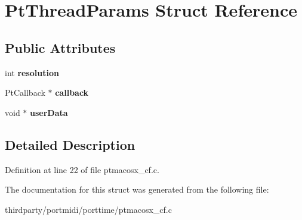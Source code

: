 \hypertarget{struct_pt_thread_params}{}\section{Pt\+Thread\+Params Struct Reference}
\label{struct_pt_thread_params}
\subsection*{Public Attributes}
\begin{DoxyCompactItemize}
\item 
\mbox{\label{struct_pt_thread_params_a774e27a8650e056ea0897bbdd9d7cc90}} 
int {\bfseries resolution}
\item 
\mbox{\label{struct_pt_thread_params_a739b9d08603ad3e13c27068d5908554d}} 
Pt\+Callback $\ast$ {\bfseries callback}
\item 
\mbox{\label{struct_pt_thread_params_ae3b2a829f0795f047aa19940a25f49e5}} 
void $\ast$ {\bfseries user\+Data}
\end{DoxyCompactItemize}


\subsection{Detailed Description}


Definition at line 22 of file ptmacosx\+\_\+cf.\+c.



The documentation for this struct was generated from the following file\+:\begin{DoxyCompactItemize}
\item 
thirdparty/portmidi/porttime/ptmacosx\+\_\+cf.\+c\end{DoxyCompactItemize}

